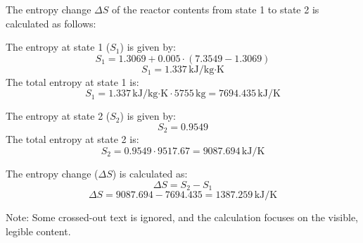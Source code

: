 The entropy change \( \Delta S \) of the reactor contents from state 1 to state 2 is calculated as follows:

The entropy at state 1 (\( S_1 \)) is given by:  
\[
S_1 = 1.3069 + 0.005 \cdot (7.3549 - 1.3069)
\]  
\[
S_1 = 1.337 \, \text{kJ/kg·K}
\]  
The total entropy at state 1 is:  
\[
S_1 = 1.337 \, \text{kJ/kg·K} \cdot 5755 \, \text{kg} = 7694.435 \, \text{kJ/K}
\]

The entropy at state 2 (\( S_2 \)) is given by:  
\[
S_2 = 0.9549
\]  
The total entropy at state 2 is:  
\[
S_2 = 0.9549 \cdot 9517.67 = 9087.694 \, \text{kJ/K}
\]

The entropy change (\( \Delta S \)) is calculated as:  
\[
\Delta S = S_2 - S_1
\]  
\[
\Delta S = 9087.694 - 7694.435 = 1387.259 \, \text{kJ/K}
\]  

Note: Some crossed-out text is ignored, and the calculation focuses on the visible, legible content.